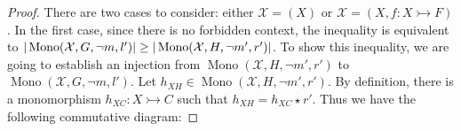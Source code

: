 \begin{proof}
    \label{antipattern:proof:lem:xglnotmlp_xhlnotmrp}
    There are two cases to consider: either $\mathcal{X} \mathop{=} (X)$ or $\mathcal{X} \mathop{=} (X, f:X \rightarrowtail F)$. 
     In the first case, since there is no forbidden context, the inequality is equivalent to $
        |\operatorname{Mono}(\mathcal{X},G,\lnot m, l')| \geq
        |\operatorname{Mono}(\mathcal{X},H,\lnot m', r')|$.
    To show this inequality, we are going to establish an injection from $\operatorname{Mono}(\mathcal{X},H,\lnot m', r')$ to $\operatorname{Mono}(\mathcal{X},G,\lnot m, l')$. Let $h_{XH} \mathop{\in} \operatorname{Mono}(\mathcal{X},H,\lnot m', r')$. By definition, there is a monomorphism $h_{XC}:X \rightarrowtail C$ such that $h_{XH} \mathop{=} h_{XC} \mathop{\star} r'$. Thus we have the following commutative diagram:


\end{proof}

